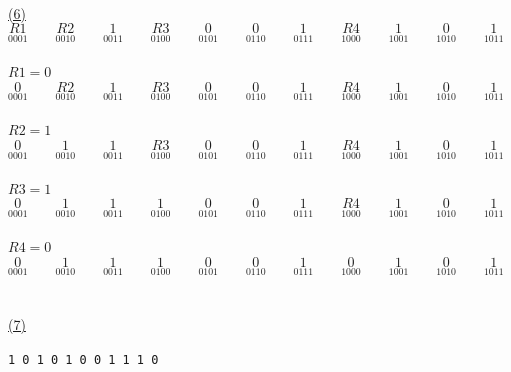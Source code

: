 \documentclass[12pt]{article}
\begin{document}
\newpage
~\\\hyperlink{toc}{\hypertarget{6.6}{(6)}}\\
\[
	\underset{0001}{R1}\qquad
	\underset{0010}{R2}\qquad
	\underset{0011}{1} \qquad
	\underset{0100}{R3}\qquad
	\underset{0101}{0} \qquad
	\underset{0110}{0} \qquad
	\underset{0111}{1} \qquad
	\underset{1000}{R4}\qquad
	\underset{1001}{1} \qquad
	\underset{1010}{0} \qquad
	\underset{1011}{1} \qquad
\]\\
$R1 = 0$\\
\[
	\underset{0001}{0}\qquad
	\underset{0010}{R2}\qquad
	\underset{0011}{1} \qquad
	\underset{0100}{R3}\qquad
	\underset{0101}{0} \qquad
	\underset{0110}{0} \qquad
	\underset{0111}{1} \qquad
	\underset{1000}{R4}\qquad
	\underset{1001}{1} \qquad
	\underset{1010}{0} \qquad
	\underset{1011}{1} \qquad
\]\\
$R2 = 1$\\
\[
	\underset{0001}{0}\qquad
	\underset{0010}{1}\qquad
	\underset{0011}{1} \qquad
	\underset{0100}{R3}\qquad
	\underset{0101}{0} \qquad
	\underset{0110}{0} \qquad
	\underset{0111}{1} \qquad
	\underset{1000}{R4}\qquad
	\underset{1001}{1} \qquad
	\underset{1010}{0} \qquad
	\underset{1011}{1} \qquad
\]\\
$R3 = 1$\\
\[
	\underset{0001}{0}\qquad
	\underset{0010}{1}\qquad
	\underset{0011}{1} \qquad
	\underset{0100}{1}\qquad
	\underset{0101}{0} \qquad
	\underset{0110}{0} \qquad
	\underset{0111}{1} \qquad
	\underset{1000}{R4}\qquad
	\underset{1001}{1} \qquad
	\underset{1010}{0} \qquad
	\underset{1011}{1} \qquad
\]\\
$R4 = 0$\\
\[
	\underset{0001}{0}\qquad
	\underset{0010}{1}\qquad
	\underset{0011}{1} \qquad
	\underset{0100}{1}\qquad
	\underset{0101}{0} \qquad
	\underset{0110}{0} \qquad
	\underset{0111}{1} \qquad
	\underset{1000}{0}\qquad
	\underset{1001}{1} \qquad
	\underset{1010}{0} \qquad
	\underset{1011}{1} \qquad
\]\\


~\\\hyperlink{toc}{\hypertarget{6.7}{(7)}}\\
\begin{center}
	\texttt{1 0 1 0 1 0 0 1 1 1 0}
\end{center}
\end{document}
